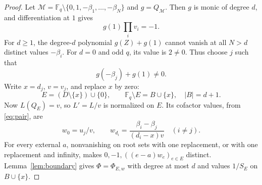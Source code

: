 \documentclass[12pt,letterpaper,onecolumn]{article}
\theoremstyle{definition}
\newcommand{\F}{\mathbb F}
\begin{document}
\begin{proof}
Let $\mathcal M=\F_q\setminus\{0,1,-\beta_1,\ldots,-\beta_N\}$ and $g=Q_{\mathcal M}$. Then $g$ is monic of degree $d$, and differentiation at $1$ gives
\begin{equation}
 g(1)\prod_i v_i=-1.
 \label{eq:g1}
\end{equation}
For $d\ge1$, the degree-$d$ polynomial $g(Z)+g(1)$ cannot vanish at all $N>d$ distinct values $-\beta_i$. For $d=0$ and odd $q$, its value is $2\ne0$. Thus choose $j$ such that
\begin{equation}
 g(-\beta_j)+g(1)\ne0.
 \label{eq:selected}
\end{equation}
Write $x=d_j$, $v=v_j$, and replace $x$ by zero:
\[
 E=(D\setminus\{x\})\cup\{0\},\qquad
 \F_q\setminus E=B\cup\{x\},\quad |B|=d+1.
\]
Now $L(Q_E)=v$, so $L'=L/v$ is normalized on $E$. Its cofactor values, from \eqref{eq:pair}, are
\begin{equation}
 w_0=u_j/v,\qquad
 w_{d_i}=\frac{\beta_i-\beta_j}{(d_i-x)v}\quad(i\ne j).
 \label{eq:w}
\end{equation}
For every external $a$, nonvanishing on root sets with one replacement, or with one replacement and infinity, makes $0,-1,((e-a)w_e)_{e\in E}$ distinct. Lemma~\ref{lem:boundary} gives $\Phi=\Phi_{E,w}$ with degree at most $d$ and values $1/S_E$ on $B\cup\{x\}$.


\end{proof}
\end{document}
